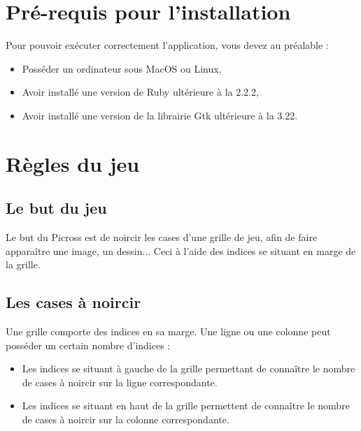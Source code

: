 \documentclass[a4paper, 12pt]{report}
\begin{document}
\begin{titlepage}
\begin{center}
	\end{center}
\end{titlepage}

\renewcommand{\contentsname}{Sommaire}
\tableofcontents
\thispagestyle{empty}
\thispagestyle{plain}



\chapter{Pré-requis pour l'installation}
\thispagestyle{empty}
\thispagestyle{plain}
    
    Pour pouvoir exécuter correctement l'application, vous devez au préalable :
    \begin{itemize}
        \item Posséder un ordinateur sous MacOS ou Linux,
        \item Avoir installé une version de Ruby ultérieure à la 2.2.2,
        \item Avoir installé une version de la librairie Gtk ultérieure à la 3.22.
    \end{itemize}


\chapter{Règles du jeu}
\thispagestyle{empty}
\thispagestyle{plain}


		\section{Le but du jeu}

            Le but du Picross est de noircir les cases d'une grille de jeu, afin de faire apparaître une image, un dessin... Ceci à l'aide des indices se situant en marge de la grille.
            

		\section{Les cases à noircir}
    
            Une grille comporte des indices en sa marge. Une ligne ou une colonne peut posséder un certain nombre d'indices :
            \begin{itemize}
                \item Les indices se situant à gauche de la grille permettant de connaître le nombre de cases à noircir sur la ligne correspondante.
                \item Les indices se situant en haut de la grille permettent de connaître le nombre de cases à noircir sur la colonne correspondante.
            \end{itemize}
	        
\end{document}
